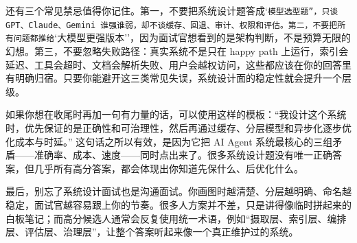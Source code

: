 还有三个常见禁忌值得你记住。第一，不要把系统设计题答成`\texttt{模型选型题''，只谈 GPT、Claude、Gemini 谁强谁弱，却不谈缓存、回退、审计、权限和评估。第二，不要把所有问题都推给}`大模型更强版本''，因为面试官想看到的是架构判断，不是预算无限的幻想。第三，不要忽略失败路径：真实系统不是只在 happy path 上运行，索引会延迟、工具会超时、文档会解析失败、用户会越权访问，这些都应该在你的回答里有明确归宿。只要你能避开这三类常见失误，系统设计面的稳定性就会提升一个层级。


如果你想在收尾时再加一句有力量的话，可以使用这样的模板：``我设计这个系统时，优先保证的是正确性和可治理性，然后再通过缓存、分层模型和异步化逐步优化成本与时延。'' 这句话之所以有效，是因为它把 AI Agent 系统最核心的三组矛盾------准确率、成本、速度------同时点出来了。很多系统设计题没有唯一正确答案，但几乎所有高分答案，都会体现出你知道先保什么、后优化什么。


最后，别忘了系统设计面试也是沟通面试。你画图时越清楚、分层越明确、命名越稳定，面试官越容易跟上你的节奏。很多人方案并不差，只是讲得像临时拼起来的白板笔记；而高分候选人通常会反复使用统一术语，例如``摄取层、索引层、编排层、评估层、治理层''，让整个答案听起来像一个真正维护过的系统。
